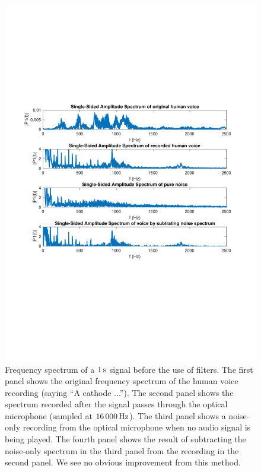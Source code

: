 \documentclass[paper-main.tex]{subfiles}
\begin{document}
\begin{figure}
\begin{center}
\includegraphics[width=\textwidth,trim={0cm 8.5cm 0 8cm},clip]{figures/freqSpectrumOriginalNoiseSubtracted.pdf}
\end{center}
\caption{\label{fig:noiseSubtract}
Frequency spectrum of a $1\,{\rm s}$ signal before the use of filters. 
The first panel shows the original frequency spectrum of the human voice recording (saying ``A cathode ...''). 
The second panel shows the spectrum recorded after the signal passes through the optical microphone (sampled at $16\,000\,{\rm Hz}$).
The third panel shows a noise-only recording from the optical microphone when no audio signal is being played. 
The fourth panel shows the result of subtracting the noise-only spectrum in the third panel from the recording in the second panel. 
We see no obvious improvement from this method. 
}
\end{figure}
\end{document}
